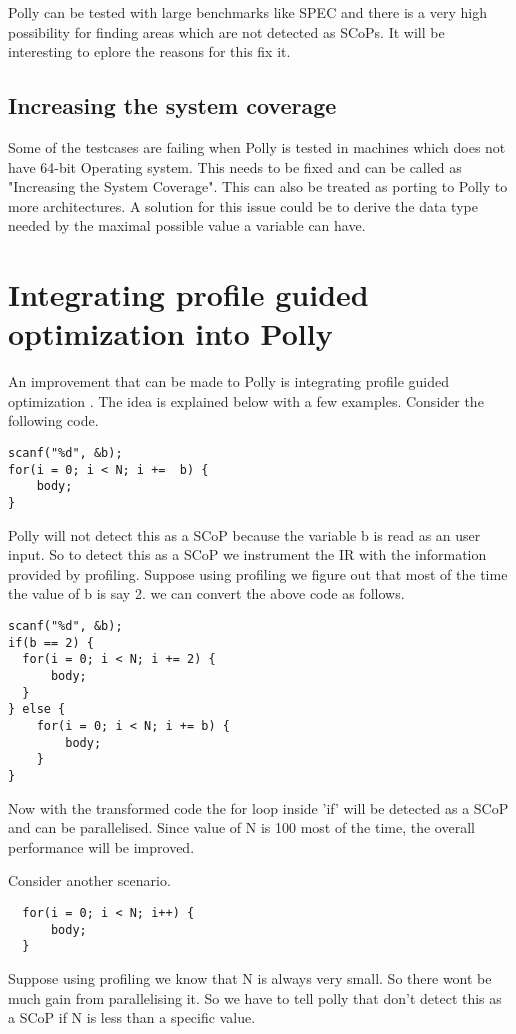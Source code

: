 Polly can be tested with large benchmarks like SPEC and there is a very high possibility
for finding areas which are not detected as SCoPs. It will be interesting to
eplore the reasons for this fix it.
\subsection{Increasing the system coverage}

Some of the testcases are failing when Polly is tested in machines which does not
have 64-bit Operating system. This needs to be fixed and can be called as "Increasing the System Coverage".
This can also be treated as porting to Polly to more architectures.
A solution for this issue could be to derive the data type needed by the maximal possible value a variable can have.

\section{Integrating profile guided optimization into Polly}
An improvement that can be made to Polly is integrating profile guided optimization
\cite{pgo}. The idea is explained below with a few examples. Consider the following code.
{\footnotesize
\begin{lstlisting}
scanf("%d", &b);
for(i = 0; i < N; i +=  b) {
    body;
}
\end{lstlisting}
}
Polly will not detect this as a SCoP because the variable b is read as an user
input. So to detect this as a SCoP we instrument the IR with the information
provided by profiling. Suppose using profiling we figure out that most of the 
time the value of b is say 2. we can convert the above code as follows.
{\footnotesize
\begin{lstlisting}
scanf("%d", &b);
if(b == 2) {
  for(i = 0; i < N; i += 2) {
      body;
  }
} else {
    for(i = 0; i < N; i += b) {
        body;
    }
}
\end{lstlisting}
}
Now with the transformed code the for loop inside 'if' will be detected as a 
SCoP and can be parallelised. Since value of N is 100 most of the time, the 
overall performance will be improved.

Consider another scenario.
{\footnotesize
\begin{lstlisting}
  for(i = 0; i < N; i++) {
      body;
  }
\end{lstlisting}
}
Suppose using profiling we know that N is always very small. So there wont be
much gain from parallelising it. So we have to tell polly that don't detect
this as a SCoP if N is less than a specific value.

